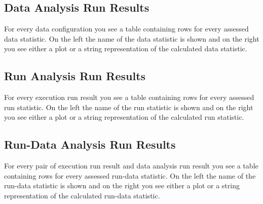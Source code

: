 	\subsection{Data Analysis Run Results}
	For every data configuration you see a table containing rows for every assessed data statistic. On the left the name of the data statistic is shown and on the right you see either a plot or a string representation of the calculated data statistic.
	\subsection{Run Analysis Run Results}
	For every execution run result you see a table containing rows for every assessed run statistic. On the left the name of the run statistic is shown and on the right you see either a plot or a string representation of the calculated run statistic.
	\subsection{Run-Data Analysis Run Results}
	For every pair of execution run result and data analysis run result you see a table containing rows for every assessed run-data statistic. On the left the name of the run-data statistic is shown and on the right you see either a plot or a string representation of the calculated run-data statistic.